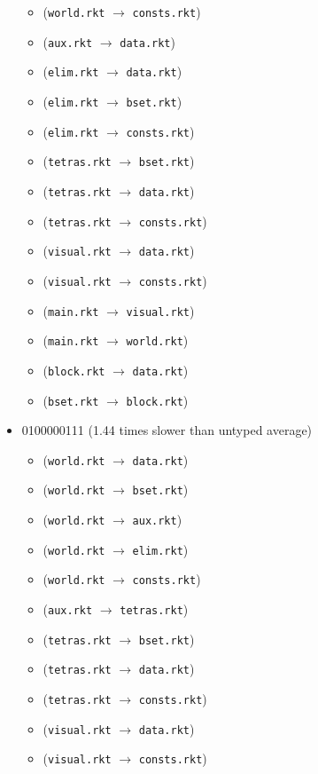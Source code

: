 \documentclass{article}
\newcommand{\mono}[1]{\texttt{#1}}
\begin{document}
\begin{itemize}
\begin{itemize}
  \item (\mono{world.rkt} $\rightarrow$ \mono{consts.rkt})
  \item (\mono{aux.rkt} $\rightarrow$ \mono{data.rkt})
  \item (\mono{elim.rkt} $\rightarrow$ \mono{data.rkt})
  \item (\mono{elim.rkt} $\rightarrow$ \mono{bset.rkt})
  \item (\mono{elim.rkt} $\rightarrow$ \mono{consts.rkt})
  \item (\mono{tetras.rkt} $\rightarrow$ \mono{bset.rkt})
  \item (\mono{tetras.rkt} $\rightarrow$ \mono{data.rkt})
  \item (\mono{tetras.rkt} $\rightarrow$ \mono{consts.rkt})
  \item (\mono{visual.rkt} $\rightarrow$ \mono{data.rkt})
  \item (\mono{visual.rkt} $\rightarrow$ \mono{consts.rkt})
  \item (\mono{main.rkt} $\rightarrow$ \mono{visual.rkt})
  \item (\mono{main.rkt} $\rightarrow$ \mono{world.rkt})
  \item (\mono{block.rkt} $\rightarrow$ \mono{data.rkt})
  \item (\mono{bset.rkt} $\rightarrow$ \mono{block.rkt})
  \end{itemize}
\item 0100000111 (1.44 times slower than untyped average)
  \begin{itemize}
  \item (\mono{world.rkt} $\rightarrow$ \mono{data.rkt})
  \item (\mono{world.rkt} $\rightarrow$ \mono{bset.rkt})
  \item (\mono{world.rkt} $\rightarrow$ \mono{aux.rkt})
  \item (\mono{world.rkt} $\rightarrow$ \mono{elim.rkt})
  \item (\mono{world.rkt} $\rightarrow$ \mono{consts.rkt})
  \item (\mono{aux.rkt} $\rightarrow$ \mono{tetras.rkt})
  \item (\mono{tetras.rkt} $\rightarrow$ \mono{bset.rkt})
  \item (\mono{tetras.rkt} $\rightarrow$ \mono{data.rkt})
  \item (\mono{tetras.rkt} $\rightarrow$ \mono{consts.rkt})
  \item (\mono{visual.rkt} $\rightarrow$ \mono{data.rkt})
  \item (\mono{visual.rkt} $\rightarrow$ \mono{consts.rkt})

\end{itemize}
\end{itemize}
\end{document}
